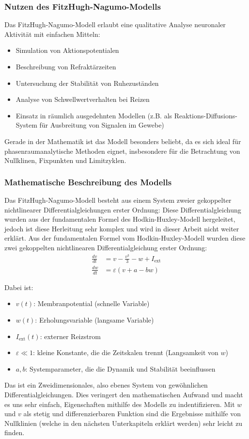 \begin{refsection}
\subsubsection{Nutzen des FitzHugh-Nagumo-Modells}
Das FitzHugh-Nagumo-Modell erlaubt eine qualitative Analyse neuronaler Aktivität mit einfachen Mitteln:
\begin{itemize}
    \item Simulation von Aktionspotentialen
    \item Beschreibung von Refraktärzeiten
    \item Untersuchung der Stabilität von Ruhezuständen
    \item Analyse von Schwellwertverhalten bei Reizen
    \item Einsatz in räumlich ausgedehnten Modellen (z.B. als Reaktions-Diffusions-System für Ausbreitung von Signalen im Gewebe)
\end{itemize}
\noindent
Gerade in der Mathematik ist das Modell besonders beliebt, da es sich ideal für phasenraumanalytische Methoden eignet, insbesondere für die Betrachtung von Nullklinen, Fixpunkten und Limitzyklen.
\subsubsection{Mathematische Beschreibung des Modells}
Das FitzHugh-Nagumo-Modell besteht aus einem System zweier gekoppelter nichtlinearer Differentialgleichungen erster Ordnung:
Diese Differentialgleichung wurden aus der fundamentalen Formel des Hodkin-Huxley-Modell hergeleitet, jedoch ist diese Herleitung sehr komplex und wird in dieser Arbeit nicht weiter erklärt. Aus der fundamentalen Formel vom Hodkin-Huxley-Modell wurden diese zwei gekoppelten nichtlinearen Differentialgleichung erster Ordnung:
\[
\begin{aligned}
	\frac{dv}{dt} &= v - \frac{v^3}{3} - w + I_{\text{ext}} \\
	\frac{dw}{dt} &= \varepsilon (v + a - b w)
\end{aligned}
\]

\noindent Dabei ist:

\begin{itemize}
	\item $v(t)$: Membranpotential (schnelle Variable)
	\item $w(t)$: Erholungsvariable (langsame Variable)
	\item $I_{\text{ext}}(t)$: externer Reizstrom
	\item $\varepsilon \ll 1$: kleine Konstante, die die Zeitskalen trennt (Langsamkeit von $w$)
	\item $a, b$: Systemparameter, die die Dynamik und Stabilität beeinflussen
\end{itemize}
Das ist ein Zweidimensionales, also ebenes System von gewöhnlichen Differentialgleichungen. Dies veringert den mathematischen Aufwand und macht es uns sehr einfach, Eigenschaften mithilfe des Modells zu indentifizieren.
Mit $w$ und $v$ als stetig und differenzierbaren Funktion sind die Ergebnisse mithilfe von Nullklinien (welche in den nächsten Unterkapiteln erklärt werden) sehr leicht zu finden.


\end{refsection}
